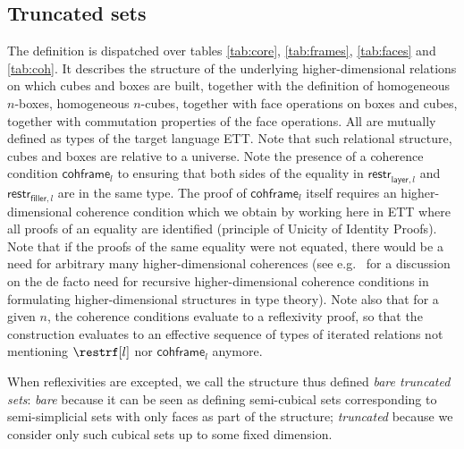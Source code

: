 \documentclass[10pt]{art}
\newcommand{\U}[1]{\ensuremath{\mathsf{U}_{#1}}}
\newcommand{\unittype}{\ensuremath{\mathsf{unit}}}
\newcommand{\defeq}{\ensuremath{\triangleq}}
\newcommand{\X}[2]{\ensuremath{\mathsf{X}_{#1}^{<#2}}}
\newcommand{\Xcomp}[2]{\ensuremath{\mathsf{X}_{#1}^{=#2}}}
\newcommand{\restrl}[2]{\ensuremath{\mathsf{restr}_{\mathsf{layer}, #1}^{#2}}}
\newcommand{\restrc}[2]{\ensuremath{\mathsf{restr}_{\mathsf{filler}, #1}^{#2}}}
\newcommand{\fullframe}[2]{\ensuremath{\mathsf{fullframe}_{#1}^{#2}}}
\newcommand{\cohframe}[2]{\ensuremath{\mathsf{cohframe}_{#1}^{#2}}}
\newcommand{\imp}{\ensuremath{\rightarrow}}
\renewcommand{\D}{\ensuremath{(D)}}
\newcommand{\eqnline}[4]{$#1$ & $#2$ & $#3$ & $#4$ \\}
\newcommand{\mc}[1]{\multicolumn{4}{c}{\textit{#1}} \\\\}
\begin{document}
\subsection{Truncated sets}
The definition is dispatched over tables \ref{tab:core}, \ref{tab:frames}, \ref{tab:faces} and \ref{tab:coh}. It describes the structure of the underlying higher-dimensional relations on which cubes and boxes are built, together with the definition of homogeneous $n$-boxes, homogeneous $n$-cubes, together with face operations on boxes and cubes, together with commutation properties of the face operations. All are mutually defined as types of the target language ETT. Note that such relational structure, cubes and boxes are relative to a universe. Note the presence of a coherence condition $\cohframe{l}{}$ to ensuring that both sides of the equality in $\restrl{l}{}$ and $\restrc{l}{}$ are in the same type. The proof of $\cohframe{l}{}$ itself requires an higher-dimensional coherence condition which we obtain by working here in ETT where all proofs of an equality are identified (principle of Unicity of Identity Proofs). Note that if the proofs of the same equality were not equated, there would be a need for arbitrary many higher-dimensional coherences (see e.g.~\cite{Herbelin15} for a discussion on the de facto need for recursive higher-dimensional coherence conditions in formulating higher-dimensional structures in type theory). Note also that for a given $n$, the coherence conditions evaluate to a reflexivity proof, so that the construction evaluates to an effective sequence of types of iterated relations not mentioning $\restrf[l]$ nor $\cohframe{l}{}$ anymore.

When reflexivities are excepted, we call the structure thus defined \emph{bare truncated sets}: \emph{bare} because it can be seen as defining semi-cubical sets corresponding to semi-simplicial sets with only faces as part of the structure; \emph{truncated} because we consider only such cubical sets up to some fixed dimension.

\end{document}
